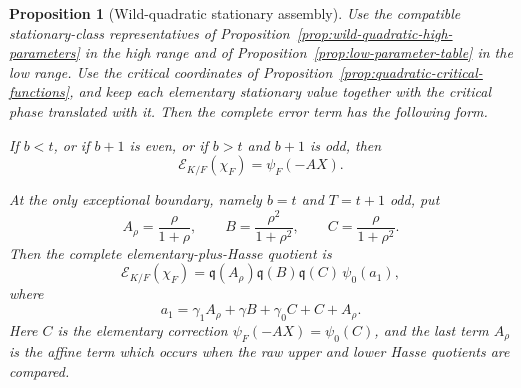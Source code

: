 \documentclass[11pt]{amsart}
\newtheorem{proposition}[theorem]{Proposition}
\theoremstyle{definition}
\theoremstyle{remark}
\newcommand{\Err}{\mathcal E}
\begin{document}
\begin{proposition}[Wild-quadratic stationary assembly]
\label{prop:quadratic-complete-assembly}
Use the compatible stationary-class representatives of
Proposition~\ref{prop:wild-quadratic-high-parameters} in the high range
and of Proposition~\ref{prop:low-parameter-table} in the low range.  Use the
critical coordinates of Proposition~\ref{prop:quadratic-critical-functions},
and keep each elementary stationary value together with the critical
phase translated with it.  Then the complete error term has the
following form.

If $b<t$, or if $b+1$ is even, or if $b>t$ and $b+1$ is odd, then
\begin{equation}\label{eq:quadratic-complete-nonboundary}
 \Err_{K/F}(\chi_F)=\psi_F(-AX).
\end{equation}

At the only exceptional boundary, namely $b=t$ and $T=t+1$ odd, put
\begin{equation}\label{eq:quadratic-ABC}
 A_\rho=\frac{\rho}{1+\rho},\qquad
 B=\frac{\rho^2}{1+\rho^2},\qquad
 C=\frac{\rho}{1+\rho^2}.
\end{equation}
Then the complete elementary-plus-Hasse quotient is
\begin{equation}\label{eq:quadratic-boundary-error-formula}
 \Err_{K/F}(\chi_F)
 =\mathfrak q(A_\rho)\mathfrak q(B)\mathfrak q(C)\,\psi_0(a_1),
\end{equation}
where
\begin{equation}\label{eq:quadratic-a1}
 a_1=\gamma_1A_\rho+\gamma B+\gamma_0C+C+A_\rho.
\end{equation}
Here $C$ is the elementary correction
$\psi_F(-AX)=\psi_0(C)$, and the last term $A_\rho$ is the affine term
which occurs when the raw upper and lower Hasse quotients are compared.
\end{proposition}
\end{document}
